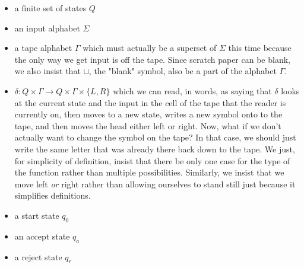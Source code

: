 \documentclass[11pt]{article}
\begin{document}
\begin{itemize}
\item a finite set of states $Q$
\item an input alphabet $\Sigma$
\item a tape alphabet $\Gamma$ which must actually be a superset of $\Sigma$ this time because the only way we get input is off the tape. Since scratch paper can be blank, we also insist that $\sqcup$, the "blank" symbol, also be a part of the alphabet $\Gamma$.
\item $\delta : Q \times \Gamma \to Q \times \Gamma \times \{L,R\}$ which we can read, in words, as saying that $\delta$ looks at the current state and the input in the cell of the tape that the reader is currently on, then moves to a new state, writes a new symbol onto to the tape, and then moves the head either left or right. Now, what if we don't actually want to change the symbol on the tape? In that case, we should just write the same letter that was already there back down to the tape. We just, for simplicity of definition, insist that there be only one case for the type of the function rather than multiple possibilities. Similarly, we insist that we move left \emph{or} right rather than allowing ourselves to stand still just because it simplifies definitions.
\item a start state $q_0$
\item an accept state $q_a$
\item a reject state $q_r$
\end{itemize}
\end{document}

